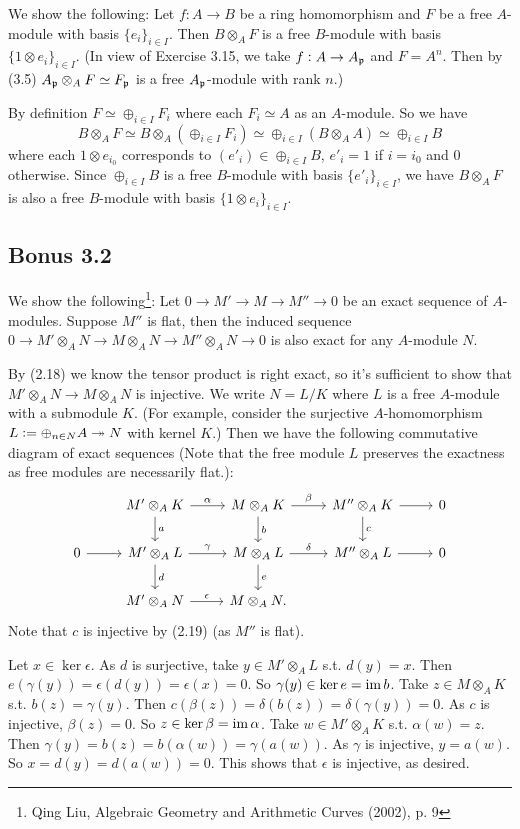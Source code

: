 \documentclass[../A&M.tex]{subfiles}
\begin{document}
We show the following: Let $f: A\to B$ be a ring homomorphism and $F$ be a free $A$-module with basis $\{e_i\}_{i\in I}$. Then $B \otimes_A F$ is a free $B$-module with basis $\{1 \otimes e_i\}_{i\in I}$. (In view of Exercise 3.15, we take $f: A \to A_{\mathfrak{p}}$ and $F=A^n$. Then by (3.5) $A_{\mathfrak{p}} \otimes_A F \simeq F_{\mathfrak{p}}$ is a free $A_{\mathfrak{p}}$-module with rank $n$.)

By definition $F \simeq \oplus_{i\in I} F_i$ where each $F_i \simeq A$ as an $A$-module. So we have
$$
B \otimes_A F \simeq B \otimes_A (\oplus_{i\in I} F_i) \simeq \oplus_{i\in I} (B \otimes_A A) \simeq \oplus_{i\in I} B
$$
where each $1 \otimes e_{i_0}$ corresponds to $(e'_i) \in \oplus_{i\in I} B$, $e'_i = 1$ if $i=i_0$ and $0$ otherwise. Since $\oplus_{i\in I} B$ is a free $B$-module with basis $\{e'_i\}_{i\in I}$, we have $B \otimes_A F$ is also a free $B$-module with basis $\{1 \otimes e_i\}_{i\in I}$.

\subsection*{Bonus 3.2} \label{Bonus 3.2}

We show the following\footnote{Qing Liu, Algebraic Geometry and
Arithmetic Curves (2002), p. 9}: Let $0 \to M' \to M \to M'' \to 0$ be an
exact sequence of $A$-modules. Suppose $M''$ is flat, then the induced sequence $0 \to M' \otimes_A N \to M \otimes_A N \to M'' \otimes_A N \to 0$ is also exact for any $A$-module $N$.

By (2.18) we know the tensor product is right exact, so it's sufficient to show that $M' \otimes_A N \to M \otimes_A N$ is injective. We write $N=L/K$ where $L$ is a free $A$-module with a submodule $K$. (For example, consider the surjective $A$-homomorphism $L := \oplus_{n\in N} A \twoheadrightarrow N$ with kernel $K$.) Then we have the following commutative diagram of exact sequences (Note that the free module $L$ preserves the exactness as free modules are necessarily flat.):
$$
\begin{tikzcd}
	& M' \otimes_A K \arrow[r, "\alpha"] \arrow[d, "a"] & M \otimes_A K \arrow[r, "\beta"] \arrow[d, "b"] & M'' \otimes_A K \arrow{r} \arrow[d, "c"] & 0 \\ 
0 \arrow{r} & M' \otimes_A L \arrow[r, "\gamma"] \arrow[d, "d"] & M \otimes_A L \arrow[r, "\delta"] \arrow[d, "e"] & M'' \otimes_A L \arrow[r] & 0 \\
	& M' \otimes_A N \arrow[r, "\epsilon"] & M \otimes_A N. & &
\end{tikzcd}
$$
Note that $c$ is injective by (2.19) (as $M''$ is flat).

Let $x \in \ker \epsilon$. As $d$ is surjective, take $y \in M' \otimes_A L$ s.t. $d(y)=x$. Then $e(\gamma(y)) = \epsilon(d(y)) = \epsilon(x) = 0$. So $\gamma(y) \in \ker e = \operatorname{im} b$. Take $z \in M \otimes_A K$ s.t. $b(z)=\gamma(y)$. Then $c(\beta(z)) = \delta(b(z)) = \delta(\gamma(y)) = 0$. As $c$ is injective, $\beta(z)=0$. So $z\in \ker \beta = \operatorname{im} \alpha$. Take $w\in M' \otimes_A K$ s.t. $\alpha(w) = z$. Then $\gamma(y) = b(z) = b(\alpha(w)) = \gamma(a(w))$. As $\gamma$ is injective, $y=a(w)$. So $x = d(y) = d(a(w)) = 0$. This shows that $\epsilon$ is injective, as desired.
\end{document}

